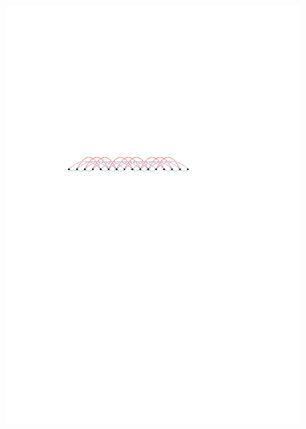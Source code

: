 \documentclass[kpfonts]{patmorin}
\begin{document}
\begin{figure}[H]
	\centering
	\includegraphics{figs/layouts-1.pdf}

\end{figure}
\end{document}
